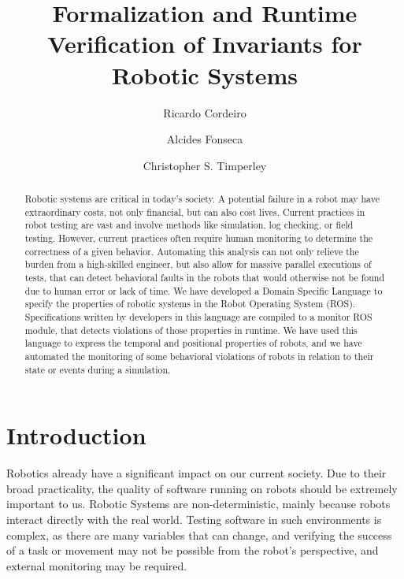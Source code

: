 \documentclass[runningheads]{llncs}
\begin{document}
%
\title{Formalization and Runtime Verification of Invariants for
Robotic Systems}
%
%
\author{Ricardo Cordeiro \and
Alcides Fonseca \and
Christopher S. Timperley}
%
%
%
\maketitle              %
%
\begin{abstract}
    Robotic systems are critical in today's society. A potential failure in a robot may have extraordinary costs, not only financial, but can also cost lives.
    Current practices in robot testing are vast and involve methods like simulation, log checking, or field testing. However, current practices often require human monitoring to determine the correctness of a given behavior. Automating this analysis can not only relieve the burden from a high-skilled engineer, but also allow for massive parallel executions of tests, that can detect behavioral faults in the robots that would otherwise not be found due to human error or lack of time.
    We have developed a Domain Specific Language to specify the properties of robotic systems in the Robot Operating System (ROS). Specifications written by developers in this language are compiled to a monitor ROS module, that detects violations of those properties in runtime. We have used this language to express the temporal and positional properties of robots, and we have automated the monitoring of some behavioral violations of robots in relation to their state or events during a simulation.

\end{abstract}
%
%
%
\section{Introduction}

Robotics already have a significant impact on our current society. Due to their broad practicality, the quality of software running on robots should be extremely important to us. Robotic Systems are non-deterministic, mainly because robots interact directly with the real world. Testing software in such environments is complex, as there are many variables that can change, and verifying the success of a task or movement may not be possible from the robot's perspective, and external monitoring may be required.
\end{document}
